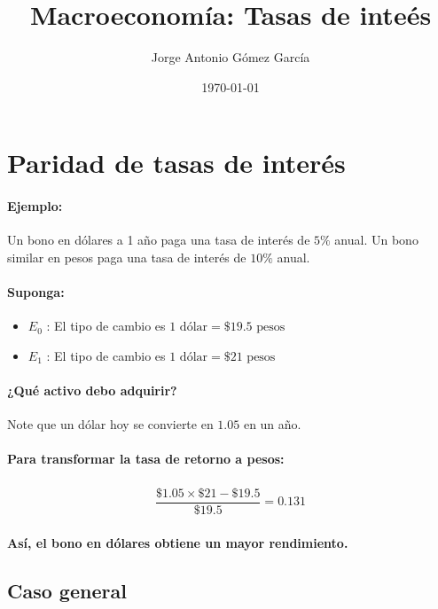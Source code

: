 \documentclass[8pt]{article}
\title{Macroeconomía: Tasas de inteés}
\author{Jorge Antonio Gómez García}
\date{\today}
\begin{document}
\maketitle
\tableofcontents

\section{Paridad de tasas de interés}

\paragraph*{Ejemplo:} Un bono en dólares a 1 año paga una tasa de interés de $5\%$ anual. Un bono similar en pesos paga una tasa de interés de $10\%$ anual.

\paragraph*{Suponga:}

\begin{itemize}
    \item $E_0$ : El tipo de cambio es $1\text{ dólar} = \$19.5\text{ pesos}$
    \item $E_1$ : El tipo de cambio es $1\text{ dólar} = \$21\text{ pesos}$
\end{itemize}

\paragraph*{¿Qué activo debo adquirir?} Note que un dólar hoy se convierte en $1.05$ en un año.

\paragraph*{Para transformar la tasa de retorno a pesos:}

\begin{align*}
    \dfrac{\$1.05 \times \$21 - \$19.5}{\$19.5} = 0.131
\end{align*}

\paragraph*{Así, el bono en dólares obtiene un mayor rendimiento.}

\subsection{Caso general}
\end{document}
